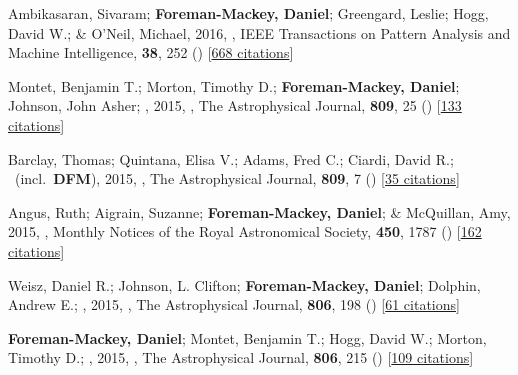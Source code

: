 \item[{\color{numcolor}\scriptsize14}] Ambikasaran, Sivaram; \textbf{Foreman-Mackey, Daniel}; Greengard, Leslie; Hogg, David W.; \& O'Neil, Michael, 2016, , IEEE Transactions on Pattern Analysis and Machine Intelligence, \textbf{38}, 252 () [\href{https://scholar.google.com/scholar?cites=7122560326210979193,5194420368165307096,3347404430934682534}{668 citations}]

\item[{\color{numcolor}\scriptsize13}] Montet, Benjamin T.; Morton, Timothy D.; \textbf{Foreman-Mackey, Daniel}; Johnson, John Asher; \etal, 2015, , The Astrophysical Journal, \textbf{809}, 25 () [\href{https://ui.adsabs.harvard.edu/abs/2015ApJ...809...25M}{133 citations}]

\item[{\color{numcolor}\scriptsize12}] Barclay, Thomas; Quintana, Elisa V.; Adams, Fred C.; Ciardi, David R.; \etal\ (incl.\ \textbf{DFM}), 2015, , The Astrophysical Journal, \textbf{809}, 7 () [\href{https://ui.adsabs.harvard.edu/abs/2015ApJ...809....7B}{35 citations}]

\item[{\color{numcolor}\scriptsize11}] Angus, Ruth; Aigrain, Suzanne; \textbf{Foreman-Mackey, Daniel}; \& McQuillan, Amy, 2015, , Monthly Notices of the Royal Astronomical Society, \textbf{450}, 1787 () [\href{https://ui.adsabs.harvard.edu/abs/2015MNRAS.450.1787A}{162 citations}]

\item[{\color{numcolor}\scriptsize10}] Weisz, Daniel R.; Johnson, L. Clifton; \textbf{Foreman-Mackey, Daniel}; Dolphin, Andrew E.; \etal, 2015, , The Astrophysical Journal, \textbf{806}, 198 () [\href{https://ui.adsabs.harvard.edu/abs/2015ApJ...806..198W}{61 citations}]

\item[{\color{numcolor}\scriptsize9}] \textbf{Foreman-Mackey, Daniel}; Montet, Benjamin T.; Hogg, David W.; Morton, Timothy D.; \etal, 2015, , The Astrophysical Journal, \textbf{806}, 215 () [\href{https://ui.adsabs.harvard.edu/abs/2015ApJ...806..215F}{109 citations}]

